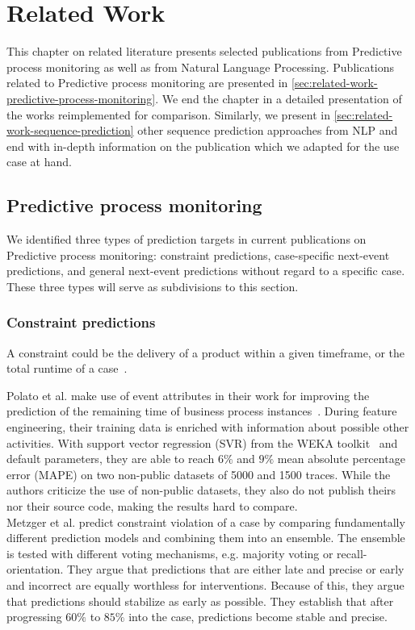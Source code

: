 \chapter{Related Work}\label{chap:related-work}
This chapter on related literature presents selected publications from Predictive process monitoring as well as from Natural Language Processing. Publications related to Predictive process monitoring are presented in \autoref{sec:related-work-predictive-process-monitoring}. We end the chapter in a detailed presentation of the works reimplemented for comparison. Similarly, we present in \autoref{sec:related-work-sequence-prediction} other sequence prediction approaches from NLP and end with in-depth information on the publication which we adapted for the use case at hand.

\section{Predictive process monitoring}\label{sec:related-work-predictive-process-monitoring}
We identified three types of prediction targets in current publications on Predictive process monitoring: constraint predictions, case-specific next-event predictions, and general next-event predictions without regard to a specific case. These three types will serve as subdivisions to this section.

\subsection*{Constraint predictions}
A constraint could be the delivery of a product within a given timeframe, or the total runtime of a case~\cite{weske2012business, francescomarino2015}.

Polato et al. make use of event attributes in their work for improving the prediction of the remaining time of business process instances~\cite{polato2014}. During feature engineering, their training data is enriched with information about possible other activities. With support vector regression (SVR) from the WEKA toolkit~\cite{web:weka} and default parameters, they are able to reach $6\%$ and $9\%$ mean absolute percentage error (MAPE) on two non-public datasets of 5000 and 1500 traces. While the authors criticize the use of non-public datasets, they also do not publish theirs nor their source code, making the results hard to compare.\\

Metzger et al. predict constraint violation of a case by comparing fundamentally different prediction models and combining them into an ensemble. The ensemble is tested with different voting mechanisms, e.g. majority voting or recall-orientation. They argue that predictions that are either late and precise or early and incorrect are equally worthless for interventions. Because of this, they argue that predictions should stabilize as early as possible. They establish that after progressing $60\%$ to $85\%$ into the case, predictions become stable and precise.

